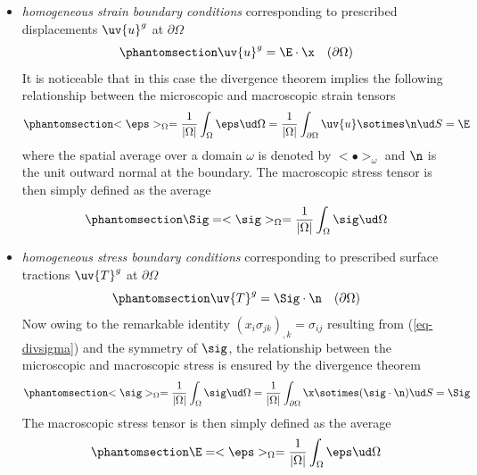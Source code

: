 \documentclass[
  letterpaper,
  DIV=11,
  numbers=noendperiod]{scrreprt}
\begin{document}
\begin{itemize}
\item
  \emph{homogeneous strain boundary conditions} corresponding to
  prescribed displacements \(\uv{u}^g\) at \(\partial\Omega\)
  \begin{equation}\phantomsection\label{eq-homstrainBC}{
  \uv{u}^g=\E\cdot\x \quad(\partial\Omega)
  }\end{equation} It is noticeable that in this case the divergence
  theorem implies the following relationship between the microscopic and
  macroscopic strain tensors
  \begin{equation}\phantomsection\label{eq-EhomstrainBC}{
  <\eps>_{\Omega}=\frac{1}{\lvert \Omega \rvert}\int_\Omega \eps\ud \Omega
  =\frac{1}{\lvert \Omega \rvert}\int_{\partial\Omega} \uv{u}\sotimes\n \ud S
  =\E
  }\end{equation} where the spatial average over a domain \(\omega\) is
  denoted by \(<\bullet>_\omega\) and \(\n\) is the unit outward normal
  at the boundary. The macroscopic stress tensor is then simply defined
  as the average \begin{equation}\phantomsection\label{eq-ShomstrainBC}{
  \Sig=
  <\sig>_{\Omega}=\frac{1}{\lvert \Omega \rvert}\int_\Omega \sig\ud \Omega
  }\end{equation}
\item
  \emph{homogeneous stress boundary conditions} corresponding to
  prescribed surface tractions \(\uv{T}^g\) at \(\partial\Omega\)
  \begin{equation}\phantomsection\label{eq-homstressBC}{
  \uv{T}^g=\Sig\cdot\n \quad(\partial\Omega)
  }\end{equation} Now owing to the remarkable identity
  \((x_i\sigma_{jk})_{,k}=\sigma_{ij}\) resulting from
  (\ref{eq-divsigma}) and the symmetry of \(\sig\), the relationship
  between the microscopic and macroscopic stress is ensured by the
  divergence theorem
  \begin{equation}\phantomsection\label{eq-ShomstressBC}{
  <\sig>_{\Omega}=\frac{1}{\lvert \Omega \rvert}\int_\Omega \sig\ud \Omega
  =\frac{1}{\lvert \Omega \rvert}\int_{\partial\Omega} \x\sotimes(\sig\cdot\n) \ud S
  =\Sig
  }\end{equation} The macroscopic stress tensor is then simply defined
  as the average \begin{equation}\phantomsection\label{eq-EhomstressBC}{
  \E=
  <\eps>_{\Omega}=\frac{1}{\lvert \Omega \rvert}\int_\Omega \eps\ud \Omega
  }\end{equation}
\end{itemize}
\end{document}

